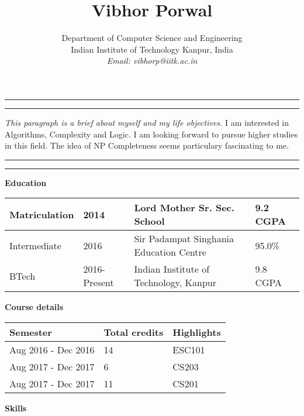 \documentclass[a4paper, 11pt]{article}
\title{Vibhor Porwal}
\author{
Department of Computer Science and Engineering\\
Indian Institute of Technology Kanpur, India\\
{\it Email: vibhorp@iitk.ac.in}
}
\makeatletter
\renewcommand{\maketitle}{\bgroup\setlength{\parindent}{0pt}
\begin{flushleft}
\textbf{\@title}

\@author
\end{flushleft}\egroup
}
\makeatother
\begin{document}
\maketitle

\noindent\hrule
\vspace{1mm}
\noindent\hrule
\vspace{1mm}
\noindent\textit{This paragraph is a brief about myself and my life objectives.}
I am interested in Algorithms, Complexity and Logic. I am looking forward to pursue higher studies in this field. The idea of NP Completeness seems particulary fascinating to me. 
\vspace{1mm}
\noindent\hrule
\vspace{1mm}
\noindent\hrule

\vspace{2mm}

\noindent\textbf{Education}
\vspace{-3mm}
\begin{flushleft}
\begin{tabular}{ |l|l|l|l| }
\hline
Matriculation & 2014 & Lord Mother Sr. Sec. School & 9.2 CGPA\\
\hline
Intermediate & 2016 & Sir Padampat Singhania Education Centre & 95.0\% \\
\hline
BTech & 2016-Present & Indian Institute of Technology, Kanpur & 9.8 CGPA \\ 
\hline
\end{tabular}
\end{flushleft}

\vspace{2mm}

\noindent\textbf{Course details}
\vspace{2mm}
\begin{flushleft}
\begin{tabular}{ |l|l|l| }
\hline
\textbf{Semester} & \textbf{Total credits} & \textbf{Highlights}\\
\hline
Aug 2016 - Dec 2016 & 14 & ESC101\\
\hline
Aug 2017 - Dec 2017 & 6 & CS203\\
\hline
Aug 2017 - Dec 2017 & 11 & CS201\\
\hline
\end{tabular}
\end{flushleft}

\vspace{3mm}

\noindent\textbf{Skills}

\vspace{2mm}
\end{document}
